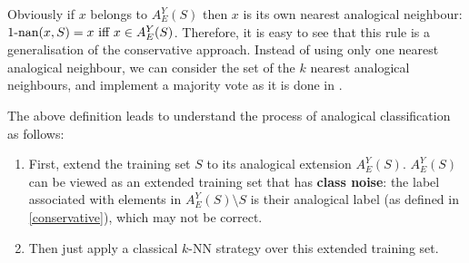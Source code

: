 Obviously if $x$ belongs to $A_E^Y(S)$ then $x$ is its own nearest analogical
neighbour: $1\mbox{-nan}(x, S) = x \text{ iff } x \in A_E^Y(S)$. Therefore, it is easy
to see that this rule is a generalisation of the conservative approach.
Instead of using only one nearest analogical neighbour, we can consider the set
of the $k$ nearest analogical neighbours, and implement a majority vote as it is
done in \cite{MicBayDelJAIR08}.

The above definition leads to understand the process of analogical classification as follows:
\begin{enumerate}
  \item First, extend the training set $S$ to its analogical extension
    $A_E^Y(S)$. $A_E^Y(S)$ can be viewed as an extended training set that has
    \textbf{class noise}: the label associated with elements in $A_E^Y(S)
    \setminus S$ is their analogical label (as defined in \ref{conservative}),
    which may not be correct.
  \item Then just apply a classical $k$-NN strategy over this extended training
    set.
\end{enumerate}

